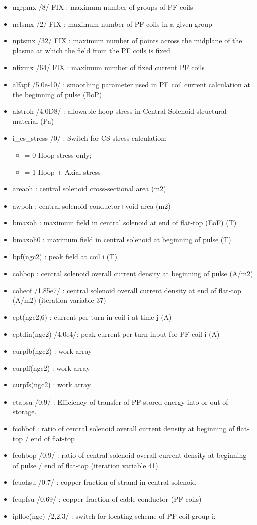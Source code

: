 \documentclass[]{article}
\providecommand{\tightlist}{%
  \setlength{\itemsep}{0pt}\setlength{\parskip}{0pt}}
\begin{document}
\begin{itemize}
\tightlist
\item
  ngrpmx /8/ FIX : maximum number of groups of PF coils
\item
  nclsmx /2/ FIX : maximum number of PF coils in a given group
\item
  nptsmx /32/ FIX : maximum number of points across the midplane of the
  plasma at which the field from the PF coils is fixed
\item
  nfixmx /64/ FIX : maximum number of fixed current PF coils
\item
  alfapf /5.0e-10/ : smoothing parameter used in PF coil current
  calculation at the beginning of pulse (BoP)
\item
  alstroh /4.0D8/ : allowable hoop stress in Central Solenoid structural
  material (Pa)
\item
  i\_cs\_stress /0/ : Switch for CS stress calculation:

  \begin{itemize}
  \tightlist
  \item
    = 0 Hoop stress only;
  \item
    = 1 Hoop + Axial stress
  \end{itemize}
\item
  areaoh : central solenoid cross-sectional area (m2)
\item
  awpoh : central solenoid conductor+void area (m2)
\item
  bmaxoh : maximum field in central solenoid at end of flat-top (EoF)
  (T)
\item
  bmaxoh0 : maximum field in central solenoid at beginning of pulse (T)
\item
  bpf(ngc2) : peak field at coil i (T)
\item
  cohbop : central solenoid overall current density at beginning of
  pulse (A/m2)
\item
  coheof /1.85e7/ : central solenoid overall current density at end of
  flat-top (A/m2) (iteration variable 37)
\item
  cpt(ngc2,6) : current per turn in coil i at time j (A)
\item
  cptdin(ngc2) /4.0e4/: peak current per turn input for PF coil i (A)
\item
  curpfb(ngc2) : work array
\item
  curpff(ngc2) : work array
\item
  curpfs(ngc2) : work array
\item
  etapsu /0.9/ : Efficiency of transfer of PF stored energy into or out
  of storage.
\item
  fcohbof : ratio of central solenoid overall current density at
  beginning of flat-top / end of flat-top
\item
  fcohbop /0.9/ : ratio of central solenoid overall current density at
  beginning of pulse / end of flat-top (iteration variable 41)
\item
  fcuohsu /0.7/ : copper fraction of strand in central solenoid
\item
  fcupfsu /0.69/ : copper fraction of cable conductor (PF coils)
\item
  ipfloc(ngc) /2,2,3/ : switch for locating scheme of PF coil group i:


\end{itemize}
\end{document}
